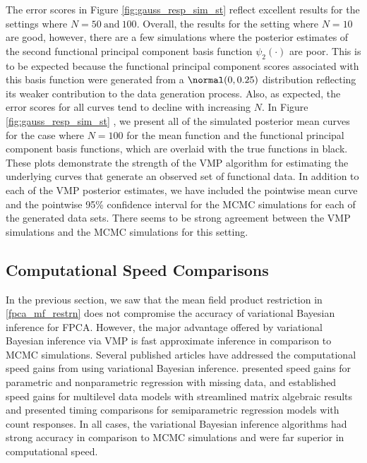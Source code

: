 \documentclass[12pt]{article}
\theoremstyle{plain}
\theoremstyle{definition}
\theoremstyle{remark}
\begin{document}
The error scores in Figure \ref{fig:gauss_resp_sim_st}  reflect excellent results for the
settings where $N = 50 \ \text{and} \ 100$. Overall, the results for the setting where $N = 10$ are good, however,
there are a few simulations where the posterior estimates of the second functional principal component basis
function $\psi_2 (\cdot)$ are poor. This is to be expected because the functional principal component scores
associated with this basis function were generated from a $\normal (0, 0.25)$ distribution reflecting its weaker
contribution to the data generation process. Also, as expected, the error scores for all curves tend to decline with
increasing $N$. In Figure \ref{fig:gauss_resp_sim_st} , we present all of the simulated
posterior mean curves for the case where $N = 100$
for the mean function and the functional principal component basis functions, which are
overlaid with the true functions in black. These plots demonstrate the strength of the VMP algorithm for estimating
the underlying curves that generate an observed set of functional data. In addition to each of the VMP posterior
estimates, we have included the pointwise mean curve and the pointwise 95\% confidence interval for the MCMC
simulations for each of the generated data sets. There seems to be strong agreement between the VMP simulations
and the MCMC simulations for this setting.


\subsection{Computational Speed Comparisons}
\label{sec:speed_comp}

In the previous section, we saw that the mean field product restriction in \eqref{fpca_mf_restrn} does not
compromise the accuracy of variational Bayesian inference for FPCA. However,
the major advantage offered by variational Bayesian inference via VMP is fast approximate inference in 
comparison to MCMC simulations. Several published articles have addressed the computational speed gains
from using variational Bayesian inference.  presented speed gains for parametric and nonparametric
regression with missing data,  and  established speed gains for multilevel data models
with streamlined matrix algebraic results and  presented timing comparisons for semiparametric regression
models with count responses. In all cases, the variational Bayesian inference algorithms had strong accuracy in
comparison to MCMC simulations and were far superior in computational speed.
\end{document}
